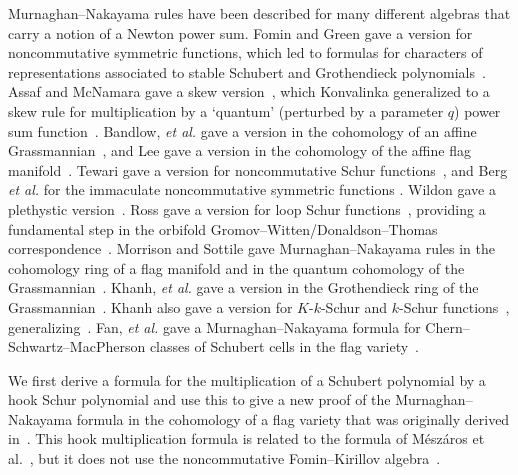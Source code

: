 \documentclass[12pt,oneside,reqno]{amsart}
\theoremstyle{definition}
\numberwithin{equation}{section}
\begin{document}
Murnaghan--Nakayama rules have been described for many different algebras
that carry a notion of a Newton power sum.
        Fomin and Green gave a version for noncommutative symmetric functions, which
        led to formulas for characters of representations associated to stable Schubert
        and Grothendieck polynomials~\cite{FoGr98}.
        Assaf and McNamara gave a skew version~\cite{A-McN}, which Konvalinka generalized to a skew
        rule for multiplication by a `quantum' (perturbed by a parameter $q$) power sum
        function~\cite{Ko12}.
        Bandlow, \emph{et al.} gave a version in the cohomology of an affine Grassmannian~\cite{BSZ11},
        and Lee gave a version in the cohomology of the affine flag manifold~\cite{Lee}.
        Tewari gave a version for noncommutative Schur functions~\cite{Tewari},
        and Berg \emph{et al.} for the immaculate noncommutative symmetric functions \cite{BBSSZ}.
        Wildon gave a plethystic version~\cite{Wildon}.
        Ross gave a version for loop Schur functions~\cite{Ro14}, providing
        a fundamental step in the orbifold Gromov--Witten/Donaldson--Thomas
        correspondence~\cite{RoZo13}.
        Morrison and Sottile gave Murnaghan--Nakayama rules in
        the cohomology ring of a flag manifold and in the quantum cohomology of the
        Grassmannian~\cite{MorrisonSottile}.
        Khanh, \emph{et al.} gave a version in the Grothendieck ring of the Grassmannian~\cite{KHST}.
        Khanh also gave a version for $K$-$k$-Schur and $k$-Schur functions~\cite{Khanh}, generalizing~\cite{BSZ11}.
        Fan, \emph{et al.}  gave a Murnaghan--Nakayama formula for Chern--Schwartz--MacPherson classes of
        Schubert cells in the flag variety~\cite{FGX}.


We first derive a formula for the multiplication of a Schubert polynomial by a hook Schur polynomial and use this to give a
new proof of the 
Murnaghan--Nakayama formula in the cohomology of a flag variety that was originally derived in~\cite{MorrisonSottile}.
This hook multiplication formula is related to the formula of M{\'e}sz{\'a}ros et al.~\cite[Thm.~2]{MPP}, but it does not use
the noncommutative Fomin--Kirillov algebra~\cite{FominKirillov}.
\end{document}
